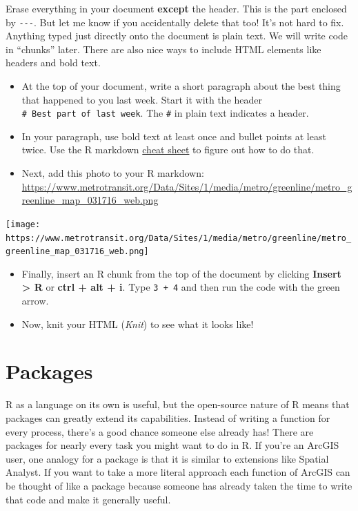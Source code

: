 \documentclass[]{book}
\begin{document}
Erase everything in your document \textbf{except} the header. This is
the part enclosed by \texttt{-\/-\/-}. But let me know if you
accidentally delete that too! It's not hard to fix. Anything typed just
directly onto the document is plain text. We will write code in
``chunks'' later. There are also nice ways to include HTML elements like
headers and bold text.

\begin{itemize}
\item
  At the top of your document, write a short paragraph about the best
  thing that happened to you last week. Start it with the header
  \texttt{\#\ Best\ part\ of\ last\ week}. The \texttt{\#} in plain text
  indicates a header.
\item
  In your paragraph, use bold text at least once and bullet points at
  least twice. Use the R markdown
  \href{https://www.rstudio.com/wp-content/uploads/2015/02/rmarkdown-cheatsheet.pdf}{cheat
  sheet} to figure out how to do that.
\item
  Next, add this photo to your R markdown:
  \url{https://www.metrotransit.org/Data/Sites/1/media/metro/greenline/metro_greenline_map_031716_web.png}
\end{itemize}

\texttt{[image: https://www.metrotransit.org/Data/Sites/1/media/metro/greenline/metro\_greenline\_map\_031716\_web.png]}

\begin{itemize}
\item
  Finally, insert an R chunk from the top of the document by clicking
  \textbf{Insert \textgreater{} R} or \textbf{ctrl + alt + i}. Type
  \texttt{3\ +\ 4} and then run the code with the green arrow.
\item
  Now, knit your HTML (\emph{Knit}) to see what it looks like!
\end{itemize}

\chapter{Packages}\label{packages}

R as a language on its own is useful, but the open-source nature of R
means that packages can greatly extend its capabilities. Instead of
writing a function for every process, there's a good chance someone else
already has! There are packages for nearly every task you might want to
do in R. If you're an ArcGIS user, one analogy for a package is that it
is similar to extensions like Spatial Analyst. If you want to take a
more literal approach each function of ArcGIS can be thought of like a
package because someone has already taken the time to write that code
and make it generally useful.
\end{document}
